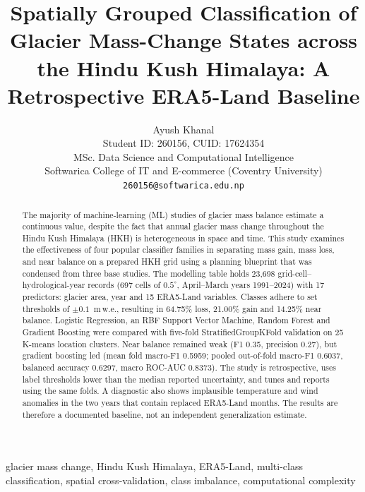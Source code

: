 \documentclass[conference]{IEEEtran}
\newcommand{\mwe}{m\,w.e.}
\begin{document}
\title{Spatially Grouped Classification of Glacier Mass-Change States across the Hindu Kush Himalaya: A Retrospective ERA5-Land Baseline}

\author{Ayush Khanal\\
Student ID: 260156, CUID: 17624354\\
MSc. Data Science and Computational Intelligence\\
Softwarica College of IT and E-commerce (Coventry University)\\
\texttt{260156@softwarica.edu.np}}

\maketitle

\begin{abstract}
The majority of machine-learning (ML) studies of glacier mass balance estimate a continuous value, despite the fact that annual glacier mass change throughout the Hindu Kush Himalaya (HKH) is heterogeneous in space and time. This study examines the effectiveness of four popular classifier families in separating mass gain, mass loss, and near balance on a prepared HKH grid using a planning blueprint that was condensed from three base studies. The modelling table holds 23,698 grid-cell--hydrological-year records (697 cells of $0.5^\circ$, April--March years 1991--2024) with 17 predictors: glacier area, year and 15 ERA5-Land variables. Classes adhere to set thresholds of $\pm0.1$~\mwe, resulting in 64.75\% loss, 21.00\% gain and 14.25\% near balance. Logistic Regression, an RBF Support Vector Machine, Random Forest and Gradient Boosting were compared with five-fold StratifiedGroupKFold validation on 25 K-means location clusters. Near balance remained weak (F1 0.35, precision 0.27), but gradient boosting led (mean fold macro-F1 0.5959; pooled out-of-fold macro-F1 0.6037, balanced accuracy 0.6297, macro ROC-AUC 0.8373). The study is retrospective, uses label thresholds lower than the median reported uncertainty, and tunes and reports using the same folds. A diagnostic also shows implausible temperature and wind anomalies in the two years that contain replaced ERA5-Land months. The results are therefore a documented baseline, not an independent generalization estimate.
\end{abstract}

\begin{IEEEkeywords}
glacier mass change, Hindu Kush Himalaya, ERA5-Land, multi-class classification, spatial cross-validation, class imbalance, computational complexity
\end{IEEEkeywords}
\end{document}
